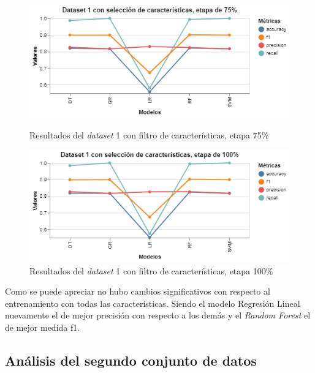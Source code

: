 \begin{figure}[htbp]
    \centering
    \begin{minipage}[t]{0.50\textwidth}
        \centering
        \includegraphics[width = \textwidth]{Graphics/dataset_1_fs_75.png}
        \caption{Resultados del \textit{dataset} 1 con filtro de características, etapa 75\%}
        \label{dataset1_fs_75}
    \end{minipage}\hfill
    \begin{minipage}[t]{0.50\textwidth}
        \centering
        \includegraphics[width = \textwidth]{Graphics/dataset_1_fs_100.png}
        \caption{Resultados del \textit{dataset} 1 con filtro de características, etapa 100\%}
        \label{dataset1_fs_100}
    \end{minipage}
\end{figure}   

Como se puede apreciar no hubo cambios significativos con respecto al entrenamiento con todas las características.  Siendo el modelo Regresión Lineal nuevamente el de mejor precisión con respecto a los demás y el \textit{Random Forest} el de mejor medida f1. 


\subsection{Análisis del segundo conjunto de datos}




